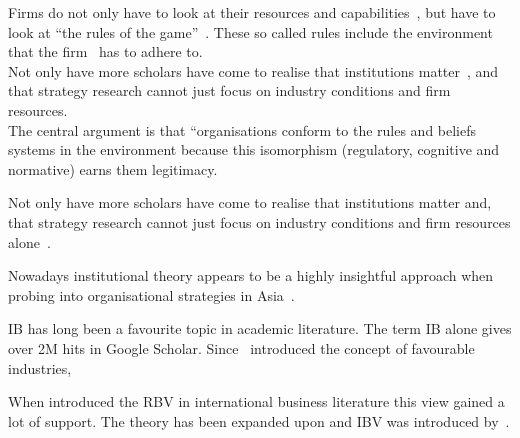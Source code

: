  Firms do not only have to look at their resources and capabilities~\cite{Barney:1991}, but have to look at ``the rules of the game''~\cite{Scott:1995}. These so called rules include the environment that the firm \mne~has to adhere to.\\


Not only have   more scholars have come to realise that institutions matter~\cite{Powell:1991,Scott:1995}, and that strategy research cannot just focus on industry conditions and firm resources.\\

The central argument is that “organisations conform to the rules and beliefs systems in the environment because this isomorphism (regulatory, cognitive and normative) earns them legitimacy.

Not only have more scholars have come to realise that institutions matter and, that strategy research cannot just focus on industry conditions and firm resources alone~\cite{Powell:1991,Scott:1995}.

Nowadays institutional theory appears to be a highly insightful approach when probing into organisational strategies in Asia~\cite{Hoskisson:2000}.

\Gls{IB} has long been a favourite topic in academic literature. The term \gls{IB} alone gives over 2M hits in Google Scholar. Since~\cite{Porter:1980} introduced the concept of favourable industries, 

When introduced the \gls{RBV} in international business literature this view gained a lot of support. 
The theory has been expanded upon and \gls{IBV} was introduced by~\cite{Kostova:1999,Meyer:2009,Wang:2012}.


\section{}

